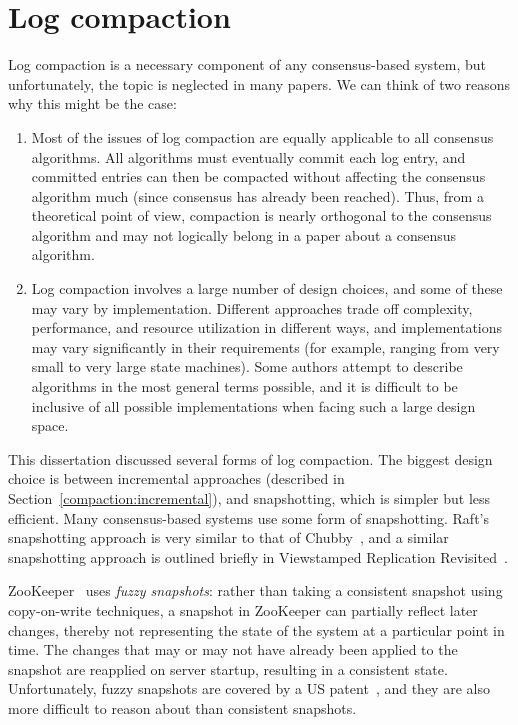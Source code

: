 \section{Log compaction}
\label{related:compaction}

Log compaction is a necessary component of any consensus-based system,
but unfortunately, the topic is neglected in many papers. We can think
of two reasons why this might be the case:
%
\begin{enumerate}
%
\item Most of the issues of log compaction are equally applicable
to all consensus algorithms. All algorithms must eventually commit each
log entry, and committed entries can then be compacted without affecting
the consensus algorithm much (since consensus has already been reached).
Thus, from a theoretical point of view, compaction is nearly orthogonal
to the consensus algorithm and may not logically belong in a paper about a
consensus algorithm.
%
\item Log compaction involves a large number of design choices,
and some of these may vary by implementation. Different approaches trade
off complexity, performance, and resource utilization in different ways,
and implementations may vary significantly in their requirements (for
example, ranging from very small to very large state machines). Some
authors attempt to describe algorithms in the most general terms
possible, and it is difficult to be inclusive of all possible
implementations when facing such a large design space.
%
\end{enumerate}

This dissertation discussed several forms of log compaction. The
biggest design choice is between incremental approaches (described in
Section~\ref{compaction:incremental}), and snapshotting, which is
simpler but less efficient.
Many consensus-based systems use some form of snapshotting.
Raft's snapshotting approach is very similar to that of Chubby~\cite{Chandra:2007},
and a similar snapshotting approach is outlined briefly in Viewstamped
Replication Revisited~\cite{Liskov:2012}.

ZooKeeper~\cite{Hunt:2010} uses \emph{fuzzy snapshots}: rather than
taking a consistent snapshot using copy-on-write techniques, a snapshot
in ZooKeeper can partially reflect later changes, thereby not
representing the state of the system at a particular point in time. The
changes that may or may not have already been applied to the snapshot
are reapplied on server startup, resulting in a consistent state.
Unfortunately, fuzzy snapshots are covered by a US
patent~\cite{Reed:2010}, and they are also more difficult to reason
about than consistent snapshots.
